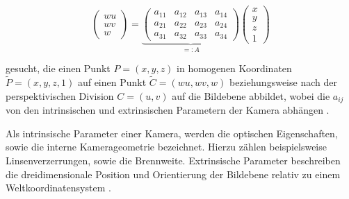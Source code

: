 \begin{equation}\label{eq:projectionMat}
	\begin{pmatrix}
	wu \\wv \\w
	\end{pmatrix} =
		\underbrace{\begin{pmatrix}
		a_{11} & a_{12} & a_{13} & a_{14} \\
		a_{21} & a_{22} & a_{23} & a_{24} \\
		a_{31} & a_{32} & a_{33} & a_{34}
		\end{pmatrix}}_{=:A}	\begin{pmatrix}
		x \\y \\z \\ 1
		\end{pmatrix}
\end{equation}


gesucht, die einen Punkt $P=(x,y,z)$ in homogenen Koordinaten $\tilde P = (x,y,z,1)$ auf einen Punkt $\tilde C = (wu,wv, w)$ beziehungsweise nach der perspektivischen Division $C = (u,v)$ auf die Bildebene abbildet, wobei die $a_{ij}$ von den intrinsischen und extrinsischen Parametern der Kamera abhängen \cite{Heikkila1997}.

Als intrinsische Parameter einer Kamera, werden die optischen Eigenschaften, sowie die interne Kamerageometrie bezeichnet. Hierzu zählen beispielsweise Linsenverzerrungen, sowie die Brennweite.
Extrinsische Parameter beschreiben die dreidimensionale Position und Orientierung der Bildebene relativ zu einem Weltkoordinatensystem  \cite{Tsai1987}.

%

